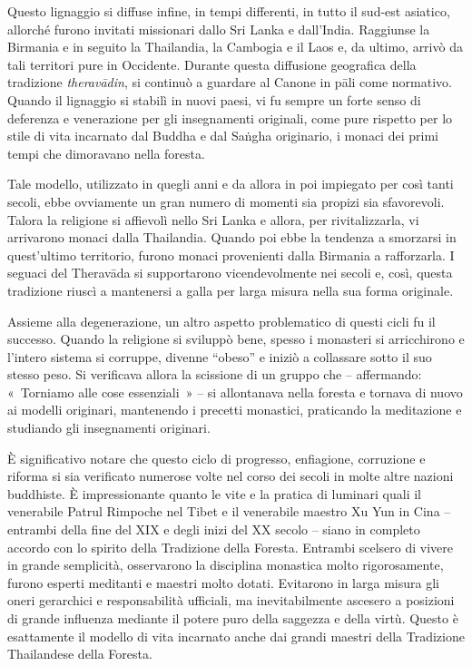 Questo lignaggio si diffuse infine, in tempi differenti, in tutto il
sud-est asiatico, allorché furono invitati missionari dallo Sri Lanka e
dall'India. Raggiunse la Birmania e in seguito la Thailandia, la
Cambogia e il Laos e, da ultimo, arrivò da tali territori pure in
Occidente. Durante questa diffusione geografica della tradizione
\emph{theravādin}, si continuò a guardare al Canone in pāli come
normativo. Quando il lignaggio si stabilì in nuovi paesi, vi fu sempre
un forte senso di deferenza e venerazione per gli insegnamenti
originali, come pure rispetto per lo stile di vita incarnato dal Buddha
e dal Saṅgha originario, i monaci dei primi tempi che dimoravano nella
foresta.

Tale modello, utilizzato in quegli anni e da allora in poi impiegato per
così tanti secoli, ebbe ovviamente un gran numero di momenti sia propizi
sia sfavorevoli. Talora la religione si affievolì nello Sri Lanka e
allora, per rivitalizzarla, vi arrivarono monaci dalla Thailandia.
Quando poi ebbe la tendenza a smorzarsi in quest'ultimo territorio,
furono monaci provenienti dalla Birmania a rafforzarla. I seguaci del
Theravāda si supportarono \mbox{vicendevolmente} nei secoli e, così, questa
tradizione riuscì a mantenersi a galla per larga misura nella sua forma
originale.

Assieme alla degenerazione, un altro aspetto problematico di questi
cicli fu il successo. Quando la religione si sviluppò bene, spesso i
monasteri si arricchirono e l'intero sistema si corruppe, divenne
``obeso'' e iniziò a collassare sotto il suo stesso peso. Si verificava
allora la scissione di un gruppo che -- affermando: «~Torniamo alle cose
essenziali~» -- si allontanava nella foresta e tornava di nuovo ai
modelli originari, mantenendo i precetti monastici, praticando la
meditazione e studiando gli insegnamenti originari.

È significativo notare che questo ciclo di progresso, enfiagione,
corruzione e riforma si sia verificato numerose volte nel corso dei
secoli in molte altre nazioni buddhiste. È impressionante quanto le vite
e la pratica di luminari quali il venerabile Patrul Rimpoche nel Tibet e
il venerabile maestro Xu Yun in Cina -- entrambi della fine del XIX e
degli inizi del XX secolo -- siano in completo accordo con lo spirito
della Tradizione della Foresta. Entrambi scelsero di vivere in grande
semplicità, osservarono la disciplina monastica molto rigorosamente,
furono esperti meditanti e maestri molto dotati. Evitarono in larga
misura gli oneri gerarchici e responsabilità ufficiali, ma
inevitabilmente ascesero a posizioni di grande influenza mediante il
potere puro della saggezza e della virtù. Questo è esattamente il
modello di vita incarnato anche dai grandi maestri della Tradizione
Thailandese della Foresta.

